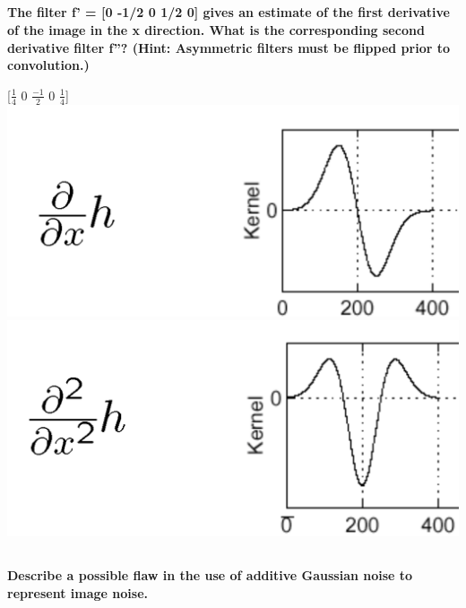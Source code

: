 \documentclass[11pt]{amsart}
\begin{document}
\subsection{}
\textbf{The filter f' = [0 -1/2 0 1/2 0] gives an estimate of the first derivative of the image in the x direction. What is the corresponding second derivative filter f''? (Hint: Asymmetric filters must be flipped prior to convolution.)} \\
\vspace{5mm}
\begin{center}
[$\frac{1}{4}$ 0 $\frac{-1}{2}$ 0 $\frac{1}{4}$] \\
\includegraphics[scale=0.25]{derivative.png}
\includegraphics[scale=0.25]{second-derivative.png}
\end{center}


\subsection{}
\textbf{Describe a possible flaw in the use of additive Gaussian noise to represent image noise.}\\
\vspace{5mm}
\end{document}
